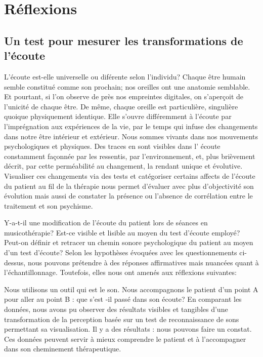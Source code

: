 \chapter{Réflexions}

 
\section{Un test pour mesurer les trans\-for\-ma\-tions de l'écoute}

L'écoute est-elle universelle ou diférente selon l'individu?
 Chaque être humain semble constitué comme son prochain;
 nos oreilles ont  une anatomie semblable. Et pourtant, si l'on
 observe de près nos empreintes digitales, on s'aperçoit de l'unicité
 de chaque être. De même, chaque oreille est particulière, singulière
 quoique physiquement identique. Elle s'ouvre différemment à l'écoute par l'imprégnation
 aux expériences de la vie, par le temps qui infuse des changements dans
 notre être intérieur et extérieur. Nous sommes vivants dans nos
 mouvements psychologiques et physiques. Des traces en sont 
 visibles dans l' écoute constamment  façonnée par les
 ressentis, par l'environnement, et, plus brièvement décrit, par cette perméabilité au
 changement, la rendant unique et évolutive.
Visualiser ces
changements via des tests et catégoriser certains affects de
l'écoute du patient au fil de la thérapie nous permet d'évaluer avec
plus d'objectivité
son évolution mais aussi
de constater la présence ou l'absence de corrélation entre le
traitement et son psychisme.

Y-a-t-il une modification de l'écoute du patient lors de séances en musicothérapie?
Est-ce visible et lisible au moyen du test d'écoute employé?
Peut-on définir et retracer un chemin sonore psychologique du patient au moyen d'un test d'écoute?
Selon les hypothèses évoquées avec les questionnements ci-dessus, nous pouvons prétendre
à des réponses
affirmatives mais nuancées quant à l'échantillonnage. Toutefois, elles nous ont amenés aux réflexions suivantes:

Nous utilisons un outil qui est le son. Nous accompagnons
le patient d'un point A pour aller au point B : que s'est -il passé
dans son écoute?
En comparant les données, nous avons pu observer des résultats visibles et tangibles 
d'une transformation de la
perception basée sur un test de reconnaissance de sons permettant sa visualisation.
Il y a des résultats : nous pouvons faire un constat.
Ces données peuvent servir à mieux comprendre le patient
et à l'accompagner dans son cheminement thérapeutique.


